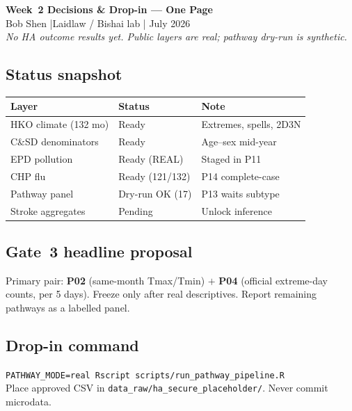 \documentclass[10pt]{article}
\begin{document}
\begin{center}
{\large\bfseries Week~2 Decisions \& Drop-in --- One Page}\\[0.2em]
{\small Bob Shen \quad|\quad Laidlaw / Bishai lab \quad| July 2026}\\[0.15em]
{\small\textit{No HA outcome results yet. Public layers are real; pathway dry-run is synthetic.}}
\end{center}

\subsection*{Status snapshot}

{\footnotesize
\begin{tabular}{@{}>{\raggedright\arraybackslash}p{3.0cm}>{\raggedright\arraybackslash}p{4.8cm}>{\raggedright\arraybackslash}p{3.5cm}@{}}
\toprule
\textbf{Layer} & \textbf{Status} & \textbf{Note} \\
\midrule
HKO climate (132 mo) & Ready & Extremes, spells, 2D3N \\
C\&SD denominators & Ready & Age--sex mid-year \\
EPD pollution & Ready (REAL) & Staged in P11 \\
CHP flu & Ready (121/132) & P14 complete-case \\
Pathway panel & Dry-run OK (17) & P13 waits subtype \\
Stroke aggregates & Pending & Unlock inference \\
\bottomrule
\end{tabular}
}

\vspace{0.4em}
\subsection*{Gate~3 headline proposal}
Primary pair: \textbf{P02} (same-month Tmax/Tmin) $+$ \textbf{P04} (official extreme-day counts, per 5 days).
Freeze only after real descriptives. Report remaining pathways as a labelled panel.

\vspace{0.25em}
\subsection*{Drop-in command}
{\footnotesize
\texttt{PATHWAY\_MODE=real Rscript scripts/run\_pathway\_pipeline.R}\\
Place approved CSV in \texttt{data\_raw/ha\_secure\_placeholder/}. Never commit microdata.
}
\end{document}
